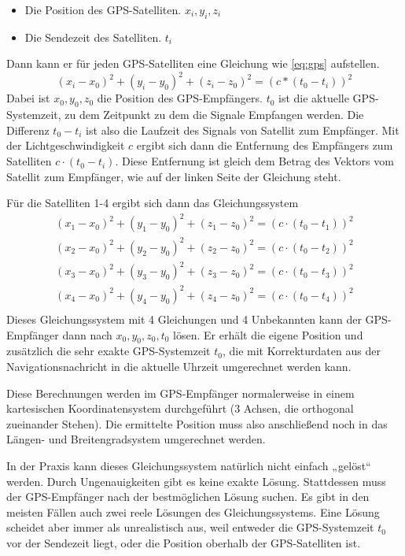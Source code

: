 \documentclass[12pt,a4paper]{scrartcl}
\begin{document}
\begin{itemize}
\item Die Position des GPS-Satelliten. $x_i,y_i,z_i$
\item Die Sendezeit des Satelliten. $t_i$
\end{itemize}

Dann kann er für jeden GPS-Satelliten eine Gleichung wie \eqref{eq:gps} aufstellen.
\begin{equation}
\label{eq:gps}
(x_i - x_0)^2 + (y_i - y_0)^2 + (z_i - z_0)^2 = (c*(t_0-t_i))^2
\end{equation}
Dabei ist $x_0,y_0,z_0$ die Position des GPS-Empfängers. $t_0$ ist die aktuelle GPS-Systemzeit, zu dem Zeitpunkt zu dem die Signale Empfangen werden. Die Differenz $t_0-t_i$ ist also die Laufzeit des Signals von Satellit zum Empfänger. Mit der Lichtgeschwindigkeit $c$ ergibt sich dann die Entfernung des Empfängers zum Satelliten $c\cdot (t_0-t_i)$. Diese Entfernung ist gleich dem Betrag des Vektors vom Satellit zum Empfänger, wie auf der linken Seite der Gleichung steht.

Für die Satelliten 1-4 ergibt sich dann das Gleichungssystem
\begin{align*}
(x_1 - x_0)^2 + (y_1 - y_0)^2 + (z_1 - z_0)^2 = (c\cdot(t_0-t_1))^2 \\
(x_2 - x_0)^2 + (y_2 - y_0)^2 + (z_2 - z_0)^2 = (c\cdot(t_0-t_2))^2 \\
(x_3 - x_0)^2 + (y_3 - y_0)^2 + (z_3 - z_0)^2 = (c\cdot(t_0-t_3))^2 \\
(x_4 - x_0)^2 + (y_4 - y_0)^2 + (z_4 - z_0)^2 = (c\cdot(t_0-t_4))^2 \\
\end{align*}
Dieses Gleichungssystem mit 4 Gleichungen und 4 Unbekannten kann der GPS-Empfänger dann nach $x_0,y_0,z_0,t_0$ lösen. Er erhält die eigene Position und zusätzlich die sehr exakte GPS-Systemzeit $t_0$, die mit Korrekturdaten aus der Navigationsnachricht in die aktuelle Uhrzeit umgerechnet werden kann.

Diese Berechnungen werden im GPS-Empfänger normalerweise in einem kartesischen Koordinatensystem durchgeführt (3 Achsen, die orthogonal zueinander Stehen). Die ermittelte Position muss also anschließend noch in das Längen- und Breitengradsystem umgerechnet werden.

In der Praxis kann dieses Gleichungssystem natürlich nicht einfach „gelöst“ werden. Durch Ungenauigkeiten gibt es keine exakte Lösung. Stattdessen muss der GPS-Empfänger nach der bestmöglichen Lösung suchen. Es gibt in den meisten Fällen auch zwei reele Lösungen des Gleichungssystems. Eine Lösung scheidet aber immer als unrealistisch aus, weil entweder die GPS-Systemzeit $t_0$ vor der Sendezeit liegt, oder die Position oberhalb der GPS-Satelliten ist.
\end{document}
